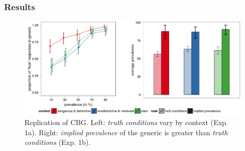 \documentclass[10pt,letterpaper]{article}
\begin{document}
\subsubsection{Results}



\begin{figure}
\centering
    \includegraphics[width=\columnwidth]{Xexp1data}
    \caption{Replication of CBG. Left: \emph{truth conditions} vary by context (Exp. 1a). Right: \emph{implied prevalence} of the generic is greater than \emph{truth conditions} (Exp. 1b).}
  \label{fig:exp1}
\end{figure}
\end{document}
